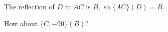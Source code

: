 











The reflection of $D$ in $AC$ is $B,$ so $\{AC\} (D) = B.$

How about $\{C,-90\} (B)?$













